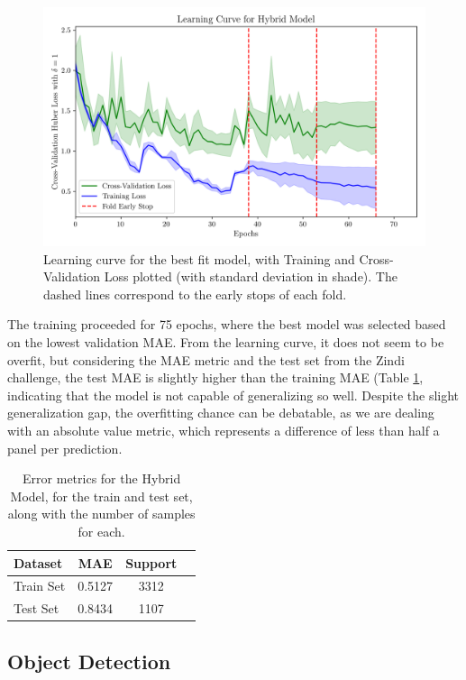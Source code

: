 \documentclass[conference]{IEEEtran}
\begin{document}
\begin{figure}[H]
    \centering
    \includegraphics[width=1\linewidth]{assets/model01_lc.png}
    \caption{Learning curve for the best fit model, with Training and Cross-Validation Loss plotted (with standard deviation in shade). The dashed lines correspond to the early stops of each fold.}
    \label{fig:model01_lc}
\end{figure}

The training proceeded for 75 epochs, where the best model was selected based on the lowest validation MAE. From the learning curve, it does not seem to be overfit, but considering the MAE metric and the test set from the Zindi challenge, the test MAE is slightly higher than the training MAE (Table \ref{tab:model01_results}, indicating that the model is not capable of generalizing so well. Despite the slight generalization gap, the overfitting chance can be debatable, as we are dealing with an absolute value metric, which represents a difference of less than half a panel per prediction. 

\begin{table}[H]
\centering
\caption{Error metrics for the Hybrid Model, for the train and test set, along with the number of samples for each.}
\label{tab:model01_results}
\begin{tabular}{lccc}
\toprule
\textbf{Dataset} & \textbf{MAE} & \textbf{Support} \\
\midrule
Train Set & 0.5127 & 3312 \\
Test Set & 0.8434 & 1107 \\
\bottomrule
\end{tabular}
\end{table}

\subsection{Object Detection}
\end{document}
